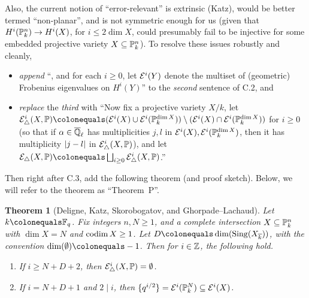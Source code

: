 \documentclass[12pt]{article}
\begin{document}
\begin{itemize}
    Also, the current notion of ``error-relevant'' is extrinsic (Katz),
    would be better termed ``non-planar'',
    and is not symmetric enough for us (given that $H^i(\mathbb{P}^n_k)\to H^i(X)$, for $i\leq 2\dim{X}$, could presumably fail to be injective for some embedded projective variety $X\subseteq \mathbb{P}^n_k$).
    To resolve these issues robustly and cleanly,
    \begin{itemize}
        \item \emph{append} ``, and for each $i\geq 0$, let $\mathcal{E}^i(Y)$ denote the multiset of (geometric) Frobenius eigenvalues on $H^i(Y)$'' to the \emph{second} sentence of C.2,
        and
        \item \emph{replace} the \emph{third} with
        ``Now fix a projective variety $X/k$,
        let $\mcal{E}^i_{\triangle}(X,\PP)\defeq (\mcal{E}^i(X)\cup \mcal{E}^i(\PP^{\dim{X}}_k))\setminus (\mcal{E}^i(X)\cap \mcal{E}^i(\PP^{\dim{X}}_k))$ for $i\geq 0$
        (so that if $\alpha\in \overline{\mathbb{Q}}_\ell$ has multiplicities $j,l$ in $\mathcal{E}^i(X),\mathcal{E}^i(\mathbb{P}^{\dim{X}}_k)$, then it has multiplicity $\lvert j-l \rvert$ in $\mathcal{E}^i_{\triangle}(X,\mathbb{P})$),
        and let $\mcal{E}_{\triangle}(X,\PP)\defeq \bigsqcup_{i\geq 0}\mcal{E}^i_{\triangle}(X,\PP)$.''
    \end{itemize}
    Then right after C.3, add the following theorem (and proof sketch).
    Below, we will refer to the theorem as ``Theorem~P''.
    \theoremstyle{plain}
    \newtheorem*{theorem*}{Theorem}
    \begin{theorem*}
    [Deligne, Katz, Skorobogatov, and Ghorpade--Lachaud]
    \label{THM:general-perversity-result}
    Let $k\defeq \FF_q$.
    Fix integers $n,N\geq 1$,
    and a complete intersection $X\subseteq \mathbb{P}^n_k$ with $\dim{X} = N$ and $\operatorname{codim}{X}\geq 1$.
    Let $D\defeq \dim(\map{Sing}(X_{\ol{k}}))$, with the convention $\dim(\emptyset)\defeq -1$.
    Then for $i\in \mathbb{Z}$, the following hold.
    \begin{enumerate}
        \item If $i\geq N+D+2$, then $\mathcal{E}^i_{\triangle}(X,\mathbb{P}) = \emptyset$.
        
        \item If $i = N+D+1$ and $2\mid i$, then $\{q^{i/2}\} = \mathcal{E}^i(\mathbb{P}^{N}_k)\subseteq \mathcal{E}^i(X)$.
    \end{enumerate}
    \end{theorem*}
    
    

\end{itemize}
\end{document}
